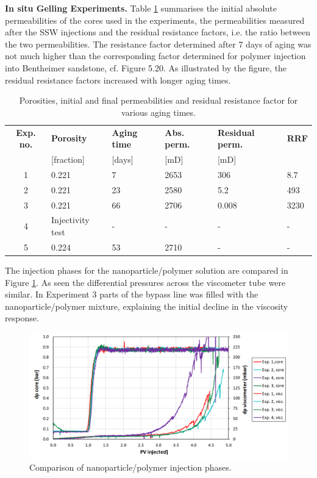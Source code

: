 \documentclass[journal = enfuem, manuscript =  article]{achemso}
\begin{document}
\textbf{In situ Gelling Experiments.}
Table \ref{tab:porPermAge} summarises the initial absolute permeabilities of the cores used in the experiments, the permeabilities measured after the SSW injections and the residual resistance factors, i.e. the ratio between the two permeabilities. The resistance factor determined after 7 days of aging was not much higher than the corresponding factor determined for polymer injection into Bentheimer sandstone, cf. Figure 5.20. As illustrated by the figure, the residual resistance factors increased with longer aging times.
\begin{table}
\small
\centering
\caption{Porosities, initial and final permeabilities and residual resistance factor for various aging times.}
\label{tab:porPermAge} %
\begin{tabular}{c l l l l l } 
\toprule
\textbf{Exp. no.} & \textbf{Porosity} & \textbf{Aging time} & \textbf{Abs. perm.} & \textbf{Residual perm.} & \textbf{RRF} \\ 
 & [fraction] & [days] & [mD] & [mD] & \\
\midrule 
1  & 0.221   &  7     & 2653     & 306      & 8.7    \\
2  & 0.221   & 23     & 2580     & 5.2      & 493      \\ 
3  & 0.221   & 66     & 2706     & 0.008    & 3230   \\ 
4  & Injectivity test & - & -    & -        & -      \\
5  & 0.224   & 53     & 2710     & -        & -      \\
\bottomrule
\end{tabular}
\end{table}

The injection phases for the nanoparticle/polymer solution are compared in Figure \ref{cht:gelexp_sum}. As seen the differential pressures across the viscometer tube were similar. In Experiment 3 parts of the bypass line was filled with the nanoparticle/polymer mixture, explaining the initial decline in the viscosity response. 

\begin{figure}[h!]
    \centering
    \includegraphics[width=\textwidth]{fig/gelexp_sum.png}
    \caption{Comparison of nanoparticle/polymer injection phases.}
    \label{cht:gelexp_sum} %
\end{figure}
 
\end{document}
